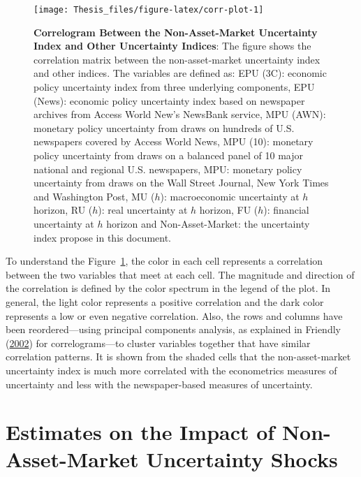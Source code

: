 \documentclass[12pt,twoside]{reedthesis}
\begin{document}
\begin{figure}

{\centering \texttt{[image: Thesis\_files/figure-latex/corr-plot-1]} 

}

\caption[Correlogram Between the Non-Asset-Market Uncertainty Index and Other Uncertainty Indices]{\textbf{Correlogram Between the Non-Asset-Market Uncertainty Index and Other Uncertainty Indices}: The figure shows the correlation matrix between the non-asset-market uncertainty index and other indices. The variables are defined as: EPU (3C): economic policy uncertainty index from three underlying components, EPU (News): economic policy uncertainty index based on newspaper archives from Access World New's NewsBank service, MPU (AWN): monetary policy uncertainty from draws on hundreds of U.S. newspapers covered by Access World News, MPU (10): monetary policy uncertainty from draws on a balanced panel of 10 major national and regional U.S. newspapers, MPU: monetary policy uncertainty from draws on the Wall Street Journal, New York Times and Washington Post, MU (\(h\)): macroeconomic uncertainty at \(h\) horizon, RU (\(h\)): real uncertainty at \(h\) horizon, FU (\(h\)): financial uncertainty at \(h\) horizon and Non-Asset-Market: the uncertainty index propose in this document.}\label{fig:corr-plot}
\end{figure}
To understand the Figure~\ref{fig:corr-plot}, the color in each cell represents a correlation between the two variables that meet at each cell. The magnitude and direction of the correlation is defined by the color spectrum in the legend of the plot. In general, the light color represents a positive correlation and the dark color represents a low or even negative correlation. Also, the rows and columns have been reordered---using principal components analysis, as explained in Friendly (\protect\hyperlink{ref-friendly:2002}{2002}) for correlograms---to cluster variables together that have similar correlation patterns. It is shown from the shaded cells that the non-asset-market uncertainty index is much more correlated with the econometrics measures of uncertainty and less with the newspaper-based measures of uncertainty.

\hypertarget{estimates-on-the-impact-of-non-asset-market-uncertainty-shocks}{%
\section{Estimates on the Impact of Non-Asset-Market Uncertainty Shocks}\label{estimates-on-the-impact-of-non-asset-market-uncertainty-shocks}}
\end{document}
